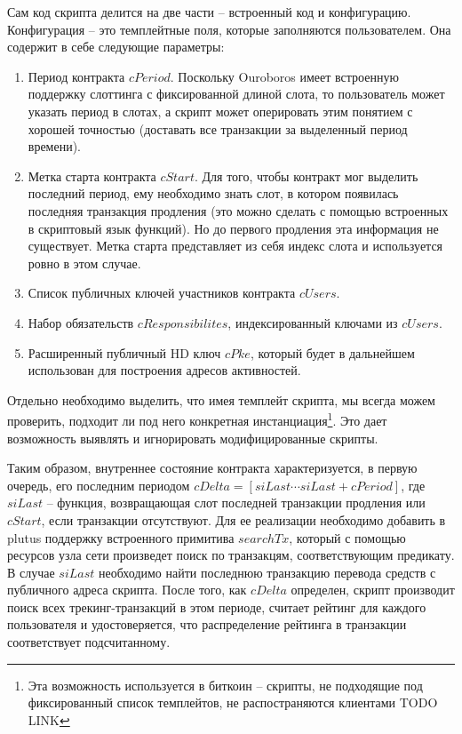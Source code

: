 \documentclass[specification,annotation]{itmo-student-thesis}
\begin{document}
Сам код скрипта делится на две части -- встроенный код и
конфигурацию. Конфигурация -- это темплейтные поля, которые
заполняются пользователем. Она содержит в себе следующие параметры:

\begin{enumerate}
\item Период контракта $cPeriod$. Поскольку Ouroboros имеет встроенную
  поддержку слоттинга с фиксированной длиной слота, то пользователь
  может указать период в слотах, а скрипт может оперировать этим
  понятием с хорошей точностью (доставать все транзакции за выделенный
  период времени).
\item Метка старта контракта $cStart$. Для того, чтобы контракт мог
  выделить последний период, ему необходимо знать слот, в котором
  появилась последняя транзакция продления (это можно сделать с
  помощью встроенных в скриптовый язык функций). Но до первого
  продления эта информация не существует. Метка старта представляет из
  себя индекс слота и используется ровно в этом случае.
\item Список публичных ключей участников контракта $cUsers$.
\item Набор обязательств $cResponsibilites$, индексированный ключами
  из $cUsers$.
\item Расширенный публичный HD ключ $cPke$, который будет в дальнейшем
  использован для построения адресов активностей.
\end{enumerate}

Отдельно необходимо выделить, что имея темплейт скрипта, мы всегда
можем проверить, подходит ли под него конкретная
инстанциация\footnote{Эта возможность используется в биткоин --
скрипты, не подходящие под фиксированный список темплейтов, не
распостраняются клиентами TODO LINK}. Это дает возможность выявлять и
игнорировать модифицированные скрипты.

Таким образом, внутреннее состояние контракта характеризуется, в
первую очередь, его последним периодом $cDelta = [siLast \cdots
siLast+cPeriod]$, где $siLast$ -- функция, возвращающая слот
последней транзакции продления или $cStart$, если транзакции
отсутствуют. Для ее реализации необходимо добавить в plutus поддержку
встроенного примитива $searchTx$, который с помощью ресурсов узла сети
произведет поиск по транзакцям, соответствующим предикату. В случае
$siLast$ необходимо найти последнюю транзакцию перевода средств с
публичного адреса скрипта. После того, как $cDelta$ определен, скрипт
производит поиск всех трекинг-транзакций в этом периоде, считает
рейтинг для каждого пользователя и удостоверяется, что распределение
рейтинга в транзакции соответствует подсчитанному.
\end{document}
